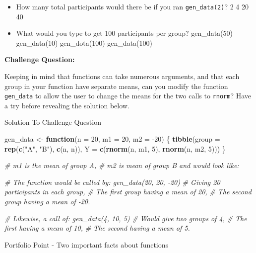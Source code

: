 \documentclass[]{book}
\newenvironment{Shaded}{\begin{snugshade}}{\end{snugshade}}
\newcommand{\CommentTok}[1]{\textcolor[rgb]{0.56,0.35,0.01}{\textit{#1}}}
\newcommand{\ControlFlowTok}[1]{\textcolor[rgb]{0.13,0.29,0.53}{\textbf{#1}}}
\newcommand{\DataTypeTok}[1]{\textcolor[rgb]{0.13,0.29,0.53}{#1}}
\newcommand{\DecValTok}[1]{\textcolor[rgb]{0.00,0.00,0.81}{#1}}
\newcommand{\KeywordTok}[1]{\textcolor[rgb]{0.13,0.29,0.53}{\textbf{#1}}}
\newcommand{\NormalTok}[1]{#1}
\newcommand{\StringTok}[1]{\textcolor[rgb]{0.31,0.60,0.02}{#1}}
\begin{document}
\begin{itemize}
\item
  How many total participants would there be if you ran \texttt{gen\_data(2)}? 2 4 20 40
\item
  What would you type to get 100 participants per group? gen\_data(50) gen\_data(10) gen\_dota(100) gen\_data(100)
\end{itemize}

\textbf{Challenge Question:}

Keeping in mind that functions can take numerous arguments, and that each group in your function have separate means, can you modify the function \texttt{gen\_data} to allow the user to change the means for the two calls to \texttt{rnorm}? Have a try before revealing the solution below.

Solution To Challenge Question

\begin{Shaded}
\begin{Highlighting}[]
\NormalTok{gen_data <-}\StringTok{ }\ControlFlowTok{function}\NormalTok{(}\DataTypeTok{n =} \DecValTok{20}\NormalTok{, }\DataTypeTok{m1 =} \DecValTok{20}\NormalTok{, }\DataTypeTok{m2 =} \DecValTok{-20}\NormalTok{) \{}
  \KeywordTok{tibble}\NormalTok{(}\DataTypeTok{group =} \KeywordTok{rep}\NormalTok{(}\KeywordTok{c}\NormalTok{(}\StringTok{"A"}\NormalTok{, }\StringTok{"B"}\NormalTok{), }\KeywordTok{c}\NormalTok{(n, n)),}
                  \DataTypeTok{Y =} \KeywordTok{c}\NormalTok{(}\KeywordTok{rnorm}\NormalTok{(n,  m1, }\DecValTok{5}\NormalTok{), }\KeywordTok{rnorm}\NormalTok{(n, m2, }\DecValTok{5}\NormalTok{)))}
\NormalTok{\}}

\CommentTok{# m1 is the mean of group A, }
\CommentTok{# m2 is mean of group B and would look like:}

\CommentTok{# The function would be called by: gen_data(20, 20, -20)}
\CommentTok{# Giving 20 participants in each group, }
\CommentTok{# The first group having a mean of 20, }
\CommentTok{# The second group having a mean of -20. }

\CommentTok{# Likewise, a call of: gen_data(4, 10, 5)}
\CommentTok{# Would give two groups of 4, }
\CommentTok{# The first having a mean of 10, }
\CommentTok{# The second having a mean of 5.}
\end{Highlighting}
\end{Shaded}

Portfolio Point - Two important facts about functions
\end{document}
